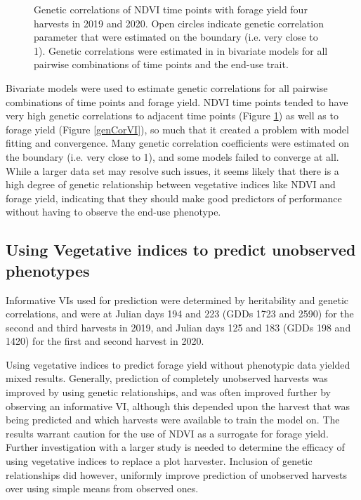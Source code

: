 \documentclass[12pt, letterpaper]{article}
\begin{document}
\begin{figure}
\begin{tikzpicture}
 \end{tikzpicture}
\caption{Genetic correlations of NDVI time points with forage yield four harvests in 2019 and 2020. Open circles indicate genetic correlation parameter that were estimated on the boundary (i.e. very close to 1). Genetic correlations were estimated in in bivariate models for all pairwise combinations of time points and the end-use trait.}
\label{genCorVItraits}
\end{figure}


Bivariate models were used to estimate genetic correlations for all pairwise combinations of time points and forage yield. NDVI time points tended to have very high genetic correlations to adjacent time points (Figure \ref{genCorVItraits}) as well as to forage yield (Figure \ref{genCorVI}), so much that it created a problem with model fitting and convergence. Many genetic correlation coefficients were estimated on the boundary (i.e. very close to 1), and some models failed to converge at all. While a larger data set may resolve such issues, it seems likely that there is a high degree of genetic relationship between vegetative indices like NDVI and forage yield, indicating that they should make good predictors of performance without having to observe the end-use phenotype. 




\subsection{Using Vegetative indices to predict unobserved phenotypes}

Informative VIs used for prediction were determined by heritability and genetic correlations, and were at Julian days 194 and 223 (GDDs 1723 and 2590) for the second and third harvests in 2019, and Julian days 125 and 183 (GDDs 198 and 1420) for the first and second harvest in 2020. 

Using vegetative indices to predict forage yield without phenotypic data yielded mixed results. Generally, prediction of completely unobserved harvests was improved by using genetic relationships, and was often improved further by observing an informative VI, although this depended upon the harvest that was being predicted and which harvests were available to train the model on. The results warrant caution for the use of NDVI as a surrogate for forage yield. Further investigation with a larger study is needed to determine the efficacy of using vegetative indices to replace a plot harvester. Inclusion of genetic relationships did however, uniformly improve prediction of unobserved harvests over using simple means from observed ones. 
\end{document}
